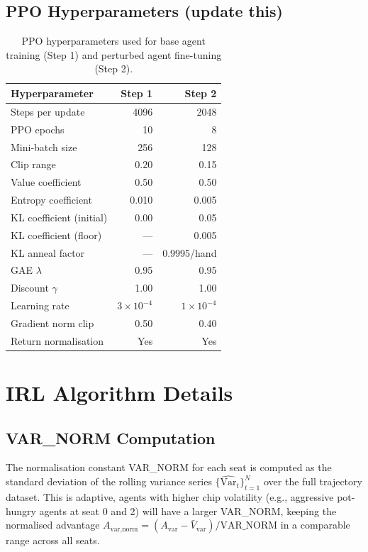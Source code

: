 \documentclass{article}
\begin{document}
\subsection{PPO Hyperparameters (update this)}
\begin{table}[h]
\caption{PPO hyperparameters used for base agent training (Step 1) and perturbed agent fine-tuning (Step 2).}
\label{tab:hyperparams}
\centering
\begin{tabular}{lrr}
\toprule
Hyperparameter & Step 1 & Step 2 \\
\midrule
Steps per update & 4096 & 2048 \\
PPO epochs & 10 & 8 \\
Mini-batch size & 256 & 128 \\
Clip range & 0.20 & 0.15 \\
Value coefficient & 0.50 & 0.50 \\
Entropy coefficient & 0.010 & 0.005 \\
KL coefficient (initial) & 0.00 & 0.05 \\
KL coefficient (floor) & --- & 0.005 \\
KL anneal factor & --- & 0.9995/hand \\
GAE $\lambda$ & 0.95 & 0.95 \\
Discount $\gamma$ & 1.00 & 1.00 \\
Learning rate & $3 \times 10^{-4}$ & $1 \times 10^{-4}$ \\
Gradient norm clip & 0.50 & 0.40 \\
Return normalisation & Yes & Yes \\
\bottomrule
\end{tabular}
\end{table}

\section{IRL Algorithm Details} \label{app:irl}

\subsection{VAR\_NORM Computation}
The normalisation constant VAR\_NORM for each seat is computed as the standard deviation of the rolling variance series $\{\widehat{\text{Var}}_t\}_{t=1}^{N}$ over the full trajectory dataset. This is adaptive, agents with higher chip volatility (e.g., aggressive pot-hungry agents at seat 0 and 2) will have a larger VAR\_NORM, keeping the normalised advantage $A_{\text{var,norm}} = (A_{\text{var}} - \bar{V}_{\text{var}}) / \text{VAR\_NORM}$ in a comparable range across all seats.
\end{document}

